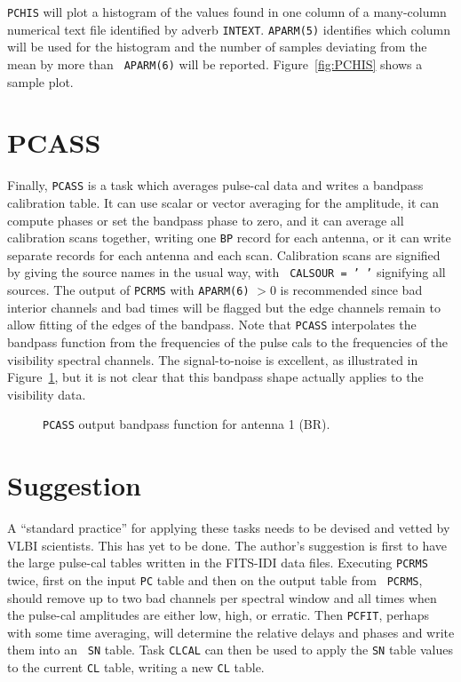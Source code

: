 \documentclass[twoside]{article}
\newcommand{\putfig}[1]{\texttt{[image: \#1.eps]}}
\begin{document}
{\tt PCHIS} will plot a histogram of the values found in one column of
a many-column numerical text file identified by adverb {\tt INTEXT}\@.
{\tt APARM(5)} identifies which column will be used for the histogram
and the number of samples deviating from the mean by more than {\tt
  APARM(6)} will be reported.  Figure~\ref{fig:PCHIS} shows a sample
plot.

\section{PCASS}

Finally, {\tt PCASS} is a task which averages pulse-cal data and
writes a bandpass calibration table.  It can use scalar or vector
averaging for the amplitude, it can compute phases or set the bandpass
phase to zero, and it can average all calibration scans together,
writing one {\tt BP} record for each antenna, or it can write separate
records for each antenna and each scan.  Calibration scans are
signified by giving the source names in the usual way, with {\tt
  CALSOUR = ' '} signifying all sources.  The output of {\tt PCRMS}
with {\tt APARM(6)} $> 0$ is recommended since bad interior channels
and bad times will be flagged but the edge channels remain to allow
fitting of the edges of the bandpass.  Note that {\tt PCASS}
interpolates the bandpass function from the frequencies of the pulse
cals to the frequencies of the visibility spectral channels.  The
signal-to-noise is excellent, as illustrated in
Figure~\ref{fig:PCASS}, but it is not clear that this bandpass shape
actually applies to the visibility data.

\begin{figure}
\begin{center}
\resizebox{4.8in}{!}{\putfig{PCASS}}
\caption{{\tt PCASS} output bandpass function for antenna 1 (BR).}
\label{fig:PCASS}
\end{center}
\end{figure}

\section{Suggestion}

A ``standard practice'' for applying these tasks needs to be devised
and vetted by VLBI scientists.  This has yet to be done.  The
author's suggestion is first to have the large pulse-cal tables
written in the FITS-IDI data files.  Executing {\tt PCRMS} twice, first
on the input {\tt PC} table and then on the output table from {\tt
 PCRMS}, should remove up to two bad channels per spectral window
and all times when the pulse-cal amplitudes are either low, high, or
erratic.  Then {\tt PCFIT}, perhaps with some time averaging, will
determine the relative delays and phases and write them into an {\tt
  SN} table. Task {\tt CLCAL} can then be used to apply the {\tt SN}
table values to the current {\tt CL} table, writing a new {\tt CL}
table.
\end{document}
